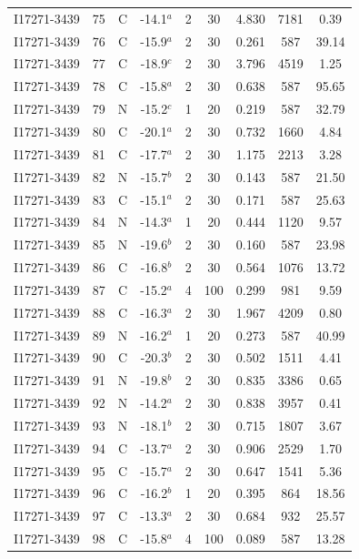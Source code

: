 \begin{table}
\begin{tabular}{ccccccccc}
I17271-3439 & 75 & C & -14.1$^{a}$ & 2 & 30 & 4.830 & 7181 & 0.39 \\
I17271-3439 & 76 & C & -15.9$^{a}$ & 2 & 30 & 0.261 & 587 & 39.14 \\
I17271-3439 & 77 & C & -18.9$^{c}$ & 2 & 30 & 3.796 & 4519 & 1.25 \\
I17271-3439 & 78 & C & -15.8$^{a}$ & 2 & 30 & 0.638 & 587 & 95.65 \\
I17271-3439 & 79 & N & -15.2$^{c}$ & 1 & 20 & 0.219 & 587 & 32.79 \\
I17271-3439 & 80 & C & -20.1$^{a}$ & 2 & 30 & 0.732 & 1660 & 4.84 \\
I17271-3439 & 81 & C & -17.7$^{a}$ & 2 & 30 & 1.175 & 2213 & 3.28 \\
I17271-3439 & 82 & N & -15.7$^{b}$ & 2 & 30 & 0.143 & 587 & 21.50 \\
I17271-3439 & 83 & C & -15.1$^{a}$ & 2 & 30 & 0.171 & 587 & 25.63 \\
I17271-3439 & 84 & N & -14.3$^{a}$ & 1 & 20 & 0.444 & 1120 & 9.57 \\
I17271-3439 & 85 & N & -19.6$^{b}$ & 2 & 30 & 0.160 & 587 & 23.98 \\
I17271-3439 & 86 & C & -16.8$^{b}$ & 2 & 30 & 0.564 & 1076 & 13.72 \\
I17271-3439 & 87 & C & -15.2$^{a}$ & 4 & 100 & 0.299 & 981 & 9.59 \\
I17271-3439 & 88 & C & -16.3$^{a}$ & 2 & 30 & 1.967 & 4209 & 0.80 \\
I17271-3439 & 89 & N & -16.2$^{a}$ & 1 & 20 & 0.273 & 587 & 40.99 \\
I17271-3439 & 90 & C & -20.3$^{b}$ & 2 & 30 & 0.502 & 1511 & 4.41 \\
I17271-3439 & 91 & N & -19.8$^{b}$ & 2 & 30 & 0.835 & 3386 & 0.65 \\
I17271-3439 & 92 & N & -14.2$^{a}$ & 2 & 30 & 0.838 & 3957 & 0.41 \\
I17271-3439 & 93 & N & -18.1$^{b}$ & 2 & 30 & 0.715 & 1807 & 3.67 \\
I17271-3439 & 94 & C & -13.7$^{a}$ & 2 & 30 & 0.906 & 2529 & 1.70 \\
I17271-3439 & 95 & C & -15.7$^{a}$ & 2 & 30 & 0.647 & 1541 & 5.36 \\
I17271-3439 & 96 & C & -16.2$^{b}$ & 1 & 20 & 0.395 & 864 & 18.56 \\
I17271-3439 & 97 & C & -13.3$^{a}$ & 2 & 30 & 0.684 & 932 & 25.57 \\
I17271-3439 & 98 & C & -15.8$^{a}$ & 4 & 100 & 0.089 & 587 & 13.28 \\

\end{tabular}
\end{table}
